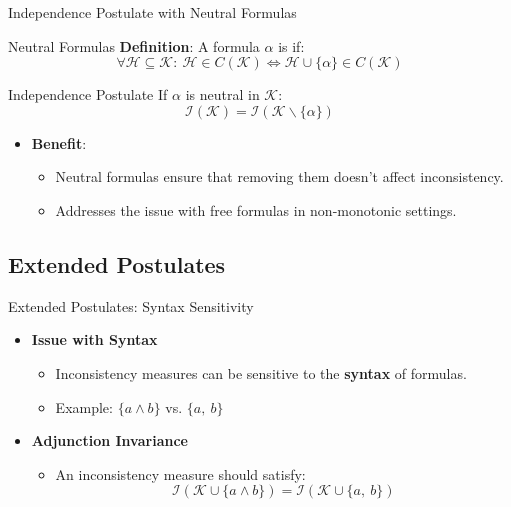 \begin{frame}{Independence Postulate with Neutral Formulas}
    \begin{block}{Neutral Formulas}
        \textbf{Definition}: A formula \( \alpha \) is  if:
        \[
            \forall \mathcal{H} \subseteq \mathcal{K}:\ \mathcal{H} \in C(\mathcal{K}) \Leftrightarrow \mathcal{H} \cup \{\alpha\} \in C(\mathcal{K})
        \]
    \end{block}
    \begin{block}{Independence Postulate}
        If \( \alpha \) is neutral in \( \mathcal{K} \):
        \[
            \mathcal{I}(\mathcal{K}) = \mathcal{I}(\mathcal{K} \backslash \{\alpha\})
        \]
    \end{block}
    \begin{itemize}
        \item \textbf{Benefit}:
              \begin{itemize}
                  \item Neutral formulas ensure that removing them doesn't affect inconsistency.
                  \item Addresses the issue with free formulas in non-monotonic settings.
              \end{itemize}
    \end{itemize}
\end{frame}

\subsection{Extended Postulates}

\begin{frame}{Extended Postulates: Syntax Sensitivity}
    \begin{itemize}
        \item \textbf{Issue with Syntax}
              \begin{itemize}
                  \item Inconsistency measures can be sensitive to the \textbf{syntax} of formulas.
                  \item Example: \( \{ a \land b \} \) vs. \( \{ a,\ b \} \)
              \end{itemize}
        \item \textbf{Adjunction Invariance}
              \begin{itemize}
                  \item An inconsistency measure should satisfy:
                        \[
                            \mathcal{I}(\mathcal{K} \cup \{ a \land b \}) = \mathcal{I}(\mathcal{K} \cup \{ a,\ b \})
                        \]
              \end{itemize}
    \end{itemize}
\end{frame}

